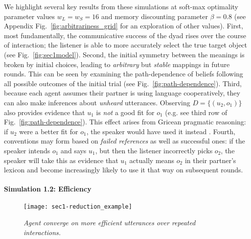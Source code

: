We highlight several key results from these simulations at soft-max optimality parameter values $w_L = w_S = 16$ and memory discounting parameter $\beta = 0.8$ (see Appendix Fig.~\ref{fig:arbitrariness_grid} for an exploration of other values).
First, most fundamentally, the communicative success of the dyad rises over the course of interaction; the listener is able to more accurately select the true target object (see Fig.~\ref{fig:sec1model}). 
Second, the initial symmetry between the meanings is broken by initial choices, leading to \emph{arbitrary} but \emph{stable} mappings in future rounds.
This can be seen by examining the path-dependence of beliefs following all possible outcomes of the initial trial (see Fig.~\ref{fig:path-dependence}). 
Third, because each agent assumes their partner is using language cooperatively, they can also make inferences about \emph{unheard} utterances. 
Observing $D = \{(u_2, o_1)\}$ also provides evidence that $u_1$ is \emph{not} a good fit for $o_1$ (e.g. see third row of Fig.~\ref{fig:path-dependence}).
This effect arises from Gricean pragmatic reasoning: if $u_2$ were a better fit for $o_1$, the speaker would have used it instead \cite{Grice75_LogicConversation}. 
Fourth, conventions may form based on \emph{failed references} as well as successful ones: if the speaker intends $o_1$ and says $u_1$, but then the listener incorrectly picks $o_2$, the speaker will take this as evidence that $u_1$ actually means $o_2$ in their partner's lexicon and become increasingly likely to use it that way on subsequent rounds.

\paragraph{Simulation 1.2: Efficiency}

\begin{figure*}
\centering
    \texttt{[image: sec1-reduction\_example]}
  \caption{\emph{Agent converge on more efficient utterances over repeated interactions.}}
  \label{fig:sec1efficiency}
\end{figure*}


